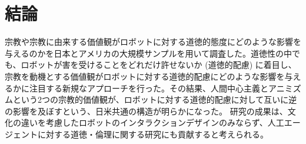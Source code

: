 \documentclass[a4j,12pt]{jreport}
\begin{document}



\newpage
\chapter{結論}
宗教や宗教に由来する価値観がロボットに対する道徳的態度にどのような影響を与えるのかを日本とアメリカの大規模サンプルを用いて調査した。道徳性の中でも、ロボットが害を受けることをどれだけ許せないか (道徳的配慮) に着目し、宗教を動機とする価値観がロボットに対する道徳的配慮にどのような影響を与えるかに注目する新規なアプローチを行った。その結果、人間中心主義とアニミズムという2つの宗教的価値観が、ロボットに対する道徳的配慮に対して互いに逆の影響を及ぼすという、日米共通の構造が明らかになった。
研究の成果は、文化の違いを考慮したロボットのインタラクションデザインのみならず、人工エージェントに対する道徳・倫理に関する研究にも貢献すると考えられる。
\end{document}
